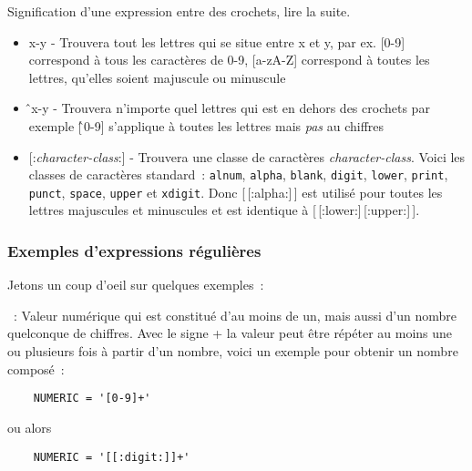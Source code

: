 Signification d'une expression entre des crochets, lire la suite.
\begin{itemize}
                \item \og{}x-y\fg{} - Trouvera tout les lettres qui se situe
                  entre \og{}x\fg{} et \og{}y\fg{}, par ex. \og{}[0-9]\fg{} correspond à tous les caractères
                  de 0-9, \og{}[a-zA-Z]\fg{} correspond à toutes les lettres, qu'elles
                  soient majuscule ou minuscule

                \item \og{}\^\,x-y\fg{} - Trouvera n'importe quel lettres qui est
                  en dehors des crochets par exemple \og{}[\^\,0-9]\fg{} s'applique à toutes les lettres
				  mais \emph{pas} au chiffres

                \item \og{}[:\emph{character-class}:]\fg{} - Trouvera une classe de caractères
				  \emph{character-class}. Voici les classes de caractères standard~: \texttt{alnum}, \texttt{alpha},
                  \texttt{blank}, \texttt{digit}, \texttt{lower}, \texttt{print}, \texttt{punct}, \texttt{space},
				  \texttt{upper} et \texttt{xdigit}. Donc \og{}[\,[:alpha:]\,]\fg{} est utilisé pour toutes
				  les lettres majuscules et minuscules et est identique à \og{}[\,[:lower:]\,[:upper:]\,]\fg{}.

\end{itemize}


\subsubsection{Exemples d'expressions régulières}

Jetons un coup d'oeil sur quelques exemples~:

~: Valeur numérique qui est constitué d’au moins de un, mais aussi d'un
nombre quelconque de chiffres. Avec le signe \og{}+\fg{} la valeur peut être répéter au
moins une ou plusieurs fois à partir d'un nombre, voici un exemple pour obtenir
un nombre composé~:

\begin{example}
\begin{verbatim}
    NUMERIC = '[0-9]+'
\end{verbatim}
\end{example}

    ou alors

\begin{example}
\begin{verbatim}
    NUMERIC = '[[:digit:]]+'
\end{verbatim}
\end{example}

